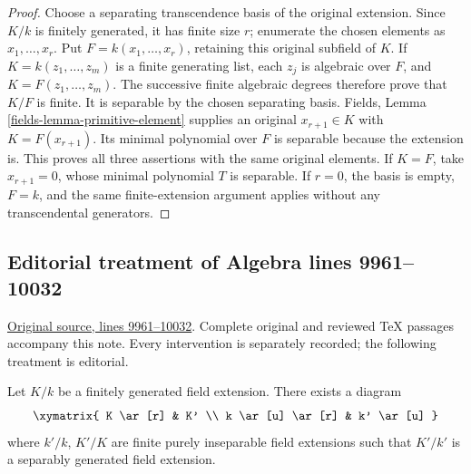 \begin{proof}
Choose a separating transcendence basis of the
original extension. Since $K/k$ is finitely
generated, it has finite size $r$; enumerate
the chosen elements as $x_1,\ldots,x_r$.
Put $F=k(x_1,\ldots,x_r)$, retaining this
original subfield of $K$. If
$K=k(z_1,\ldots,z_m)$ is a finite generating
list, each $z_j$ is algebraic over $F$,
and $K=F(z_1,\ldots,z_m)$. The successive
finite algebraic degrees therefore prove
that $K/F$ is finite. It is separable by
the chosen separating basis. Fields,
Lemma \ref{fields-lemma-primitive-element}
supplies an original $x_{r+1}\in K$ with
$K=F(x_{r+1})$. Its minimal polynomial over
$F$ is separable because the extension is.
This proves all three assertions with the
same original elements. If $K=F$, take
$x_{r+1}=0$, whose minimal polynomial $T$
is separable. If $r=0$, the basis is empty,
$F=k$, and the same finite-extension
argument applies without any transcendental
generators.
\end{proof}


\subsection{Editorial treatment of Algebra lines 9961--10032}

\hypertarget{algebra-context-118}{}

\noindent\href{https://github.com/stacks/stacks-project/blob/a04446e57ec1fbc252a871afcec7752fb2807b14/algebra.tex\#L9961}{Original source, lines 9961--10032}. Complete original and reviewed TeX passages accompany this note. Every intervention is separately recorded; the following treatment is editorial.


\begin{lemma}
\label{editorial-source-lemma-make-separably-generated}
Let $K/k$ be a finitely generated field extension.
There exists a diagram
$$
\xymatrix{
K \ar[r] & K' \\
k \ar[u] \ar[r] & k' \ar[u]
}
$$
where $k'/k$, $K'/K$ are finite purely inseparable field
extensions such that $K'/k'$ is a separably generated field extension.
\end{lemma}


